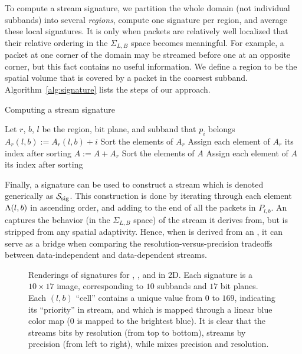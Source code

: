 To compute a stream signature, we partition the whole domain (not individual subbands) into several
\emph{regions}, compute one signature per region, and average these local signatures. It is only
when packets are relatively well localized that their relative ordering in the $\Sigma_{L,B}$ space
becomes meaningful. For example, a packet at one corner of the domain may be streamed before one at
an opposite corner, but this fact contains no useful information. We define a region to be the
spatial volume that is covered by a packet in the coarsest subband. Algorithm~\ref{alg:signature}
lists the steps of our approach.

\begin{algorithm}[h]
  \caption{Computing a stream signature}
  \begin{algorithmic}[1]
			\State Let $r$, $b$, $l$ be the region, bit plane, and subband that $p_i$ belongs
			\State $A_r(l,b) := A_r(l,b)+i$
		\EndFor
			\State Sort the elements of $A_r$
			\State Assign each element of $A_r$ its index after sorting
			\State $A := A+A_r$
		\EndFor
		\State Sort the elements of $A$
		\State Assign each element of $A$ its index after sorting
	\end{algorithmic}
	\label{alg:signature}
\end{algorithm}

Finally, a signature can be used to construct a stream which is denoted generically as $\ssig$. This
construction is done by iterating through each element $\sgn(l,b)$ in ascending order, and adding to
the end of \ssig all the packets in $P_{l,b}$. An \ssig captures the behavior (in the $\Sigma_{L,B}$
space) of the stream it derives from, but is stripped from any spatial adaptivity. Hence, when \ssig
is derived from an \sopt, it can serve as a bridge when comparing the resolution-versus-precision
tradeoffs between data-independent and data-dependent streams.

\begin{figure}[t]
\centering
\caption{Renderings of signatures for \slvl, \sbit, and \swav in 2D. Each signature is a $10\times
17$ image, corresponding to $10$ subbands and $17$ bit planes. Each $(l,b)$ ``cell'' contains a
unique value from $0$ to $169$, indicating its ``priority'' in stream, and which is mapped through a
linear blue color map ($0$ is mapped to the brightest blue). It is clear that the \slvl streams bits
by resolution (from top to bottom), \sbit streams by precision (from left to right), while \swav
mixes precision and resolution.}
\label{fig:example-signatures}
\end{figure}
